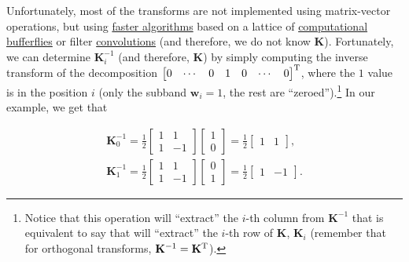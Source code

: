 Unfortunately, most of the transforms are not implemented using
matrix-vector operations, but using
\href{https://en.wikipedia.org/wiki/Fast_Fourier_transform}{faster
  algorithms} based on a lattice of
\href{https://en.wikipedia.org/wiki/Butterfly_diagram}{computational
  bufferflies} or filter
\href{https://en.wikipedia.org/wiki/Filter_(signal_processing)}{convolutions}
(and therefore, we do not know ${\mathbf K}$). Fortunately, we can
determine ${\mathbf K}_i^{-1}$ (and therefore, ${\mathbf K}$) by simply computing the inverse transform of
the decomposition
$\begin{bmatrix} 0 & \cdots & 0 & 1 & 0 & \cdots &
  0 \end{bmatrix}^{\text T}$, where the $1$ value is in the position
$i$ (only the subband ${\mathbf w}_i=1$, the rest are
``zeroed'').\footnote{Notice that this operation will ``extract'' the
  $i$-th column from ${\mathbf K}^{-1}$ that is equivalent to say that
  will ``extract'' the $i$-th row of ${\mathbf K}$, ${\mathbf K}_i$
  (remember that for orthogonal transforms,
  ${\mathbf K}^{-1}={\mathbf K}^{\text T}$).} In our example, we get
that

\begin{equation}
  \begin{array}{l}
    {\mathbf K}_0^{-1} = \frac{1}{2}
    \begin{bmatrix}
      1 & 1 \\
      1 & -1
    \end{bmatrix} 
          \begin{bmatrix}
            1 \\
            0
          \end{bmatrix}
    =  \frac{1}{2}
    \begin{bmatrix}
      1 & 1
    \end{bmatrix},
    \\
    {\mathbf K}_1^{-1} =  \frac{1}{2}
    \begin{bmatrix}
      1 & 1 \\
      1 & -1
    \end{bmatrix}
          \begin{bmatrix}
            0 \\
            1
          \end{bmatrix}
    =  \frac{1}{2}
    \begin{bmatrix}
      1 & -1
    \end{bmatrix}.
  \end{array}
\end{equation}
\begin{comment}
that, as you can see, correspond to the columns of the inverse
transform matrix ${\mathbf K}^{-1}$. Notice that this is true for all orthogonal transforms whose analysis and synthesis matrices are symmetric. %
\end{comment}

